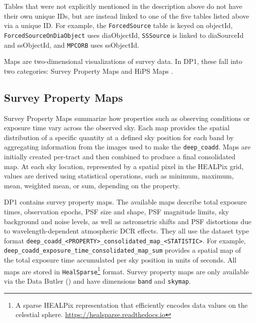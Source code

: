 Tables that were not explicitly mentioned in the description above do not have their own unique IDs, but are instead linked to one of the five tables listed above via a unique ID.
For example, the \texttt{ForcedSource} table is keyed on objectId, \texttt{ForcedSourceOnDiaObject} uses diaObjectId, \texttt{SSSource} is linked to diaSourceId and ssObjectId, and \texttt{MPCORB} uses ssObjectId.



Maps are two-dimensional visualizations of survey data. 
In \gls{DP1}, these fall into two categories: Survey Property Maps and \gls{HiPS} Maps \citep{2015A&A...578A.114F}.

\subsection{Survey Property Maps}
Survey Property Maps \citep{10.71929/rubin/2570315} summarize how properties such as observing conditions or exposure time vary across the observed sky.
Each map provides the spatial distribution of a specific quantity at a defined sky position for each band by aggregating information from the images used to make the \texttt{deep\_coadd}.
Maps are initially created per-\gls{tract} and then combined to produce a final consolidated map.
At each sky location, represented by a spatial pixel in the \gls{HEALPix}\citep{2005ApJ...622..759G} grid, values are derived using statistical operations, such as minimum, maximum, mean, weighted mean, or sum, depending on the property.

DP1 contains \nsurveypropertymaps survey property maps.
The available maps describe total exposure times, observation epochs, \gls{PSF} size and \gls{shape}, \gls{PSF} magnitude limits, sky \gls{background} and noise levels, as well as astrometric shifts and \gls{PSF} distortions due to wavelength-dependent atmospheric \gls{DCR} effects.
They all use the dataset type  format \texttt{deep\_coadd\_<PROPERTY>\_consolidated\_map\_<STATISTIC>}.
For example, \texttt{deep\_coadd\_exposure\_time\_consolidated\_map\_sum} provides a spatial map of the total exposure time accumulated per
sky position in units of seconds.
All maps are stored in \texttt{HealSparse}\footnote{A sparse \gls{HEALPix}
representation that efficiently encodes data values on the celestial sphere. \url{https://healsparse.readthedocs.io}} format.
Survey property maps are only available via the Data \gls{Butler} () and  have dimensions \texttt{band} and \texttt{skymap}.


